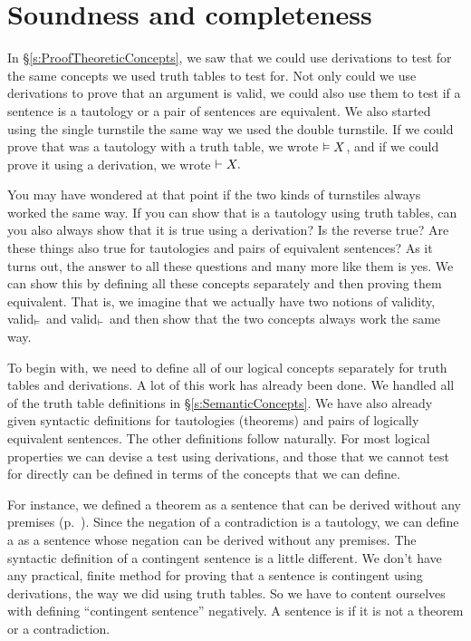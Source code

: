\chapter{Soundness and completeness}
\label{sec:soundness_and_completeness}\nonexaminable

In \S\ref{s:ProofTheoreticConcepts}, we saw that we could use derivations to test for the same concepts we used truth tables to test for. Not only could we use derivations to prove that an argument is valid, we could also use them to test if a sentence is a tautology or a pair of sentences are equivalent. We also started using the single turnstile the same way we used the double turnstile. If we could prove that \metaX was a tautology with a truth table, we wrote $\vDash X$, and if we could prove it using a derivation, we wrote $\vdash X.$ 

You may have wondered at that point if the two kinds of turnstiles always worked the same way. If you can show that \metaX is a tautology using truth tables, can you also always show that it is true using a derivation? Is the reverse true? Are these things also true for tautologies and pairs of equivalent sentences? As it turns out, the answer to all these questions and many more like them is yes. We can show this by defining all these concepts separately and then proving them equivalent. That is, we imagine that we actually have two notions of validity, valid$_{\vDash}$ and  valid$_{\vdash}$ and then show that the two concepts always work the same way. 

To begin with, we need to define all of our logical concepts separately for truth tables and derivations. A lot of this work has already been done. We handled all of the truth table definitions in \S\ref{s:SemanticConcepts}. We have also already given syntactic definitions for tautologies (theorems) and pairs of logically equivalent sentences. The other definitions follow naturally. For most logical properties we can devise a test using derivations, and those that we cannot test for directly can be defined in terms of the concepts that we can define.

For instance, we defined a theorem as a sentence that can be derived without any premises (p.~\pageref{def:syntactic_tautology_in_sl}). Since the negation of a contradiction is a tautology, we can define a  \label{def:syntactic_contradiction_in_sl} as a sentence whose negation can be derived without any premises. The syntactic definition of a contingent sentence is a little different. We don't have any practical, finite method for proving that a sentence is contingent using derivations, the way we did using truth tables. So we have to content ourselves with defining ``contingent sentence'' negatively. A sentence is  \label{def:syntactically_contingent_in_sl} if it is not a theorem or a contradiction. 
 

